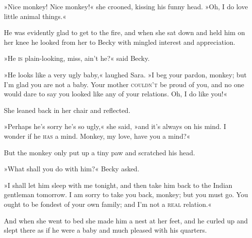 »Nice monkey! Nice monkey!« she crooned, kissing his funny head. »Oh, I do love little animal things.«

He was evidently glad to get to the fire, and when she sat down and held him on her knee he looked from her to Becky with mingled interest and appreciation.

»He \textsc{is} plain-looking, miss, ain't he?« said Becky.

»He looks like a very ugly baby,« laughed Sara. »I beg your pardon, monkey; but I'm glad you are not a baby. Your mother \textsc{couldn't} be proud of you, and no one would dare to say you looked like any of your relations. Oh, I do like you!«

She leaned back in her chair and reflected.

»Perhaps he's sorry he's so ugly,« she said, »and it's always on his mind. I wonder if he \textsc{has} a mind. Monkey, my love, have you a mind?«

But the monkey only put up a tiny paw and scratched his head.

»What shall you do with him?« Becky asked.

»I shall let him sleep with me tonight, and then take him back to the Indian gentleman tomorrow. I am sorry to take you back, monkey; but you must go. You ought to be fondest of your own family; and I'm not a \textsc{real} relation.«

And when she went to bed she made him a nest at her feet, and he curled up and slept there as if he were a baby and much pleased with his quarters.